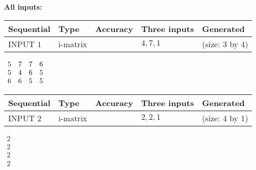 \documentclass[12pt]{article}
\begin{document}
   
\noindent\vspace{0.1in}\hspace{-0.08in} {\textbf{\Large{All inputs: }}}
   
   
  
  
\noindent\begin{tabular}{|l|l|l|l|l|}
\hline
 Sequential & Type & Accuracy & Three inputs & Generated \\ 
\hline
 
 
  INPUT $           1$ & i-matrix &  & $
 4
 , 
 7
 , 
 1
 $ & (size:           3 by           4)
 \\  \hline  
 \end{tabular}
   
   
 $\begin{array}{
 c
 c
 c
 c
 }
           5 & 
           7 & 
           7 & 
           6 \\ 
           5 & 
           4 & 
           6 & 
           5 \\ 
           6 & 
           6 & 
           5 & 
           5
\end{array}  $ 
  
  
\noindent\begin{tabular}{|l|l|l|l|l|}
\hline
 Sequential & Type & Accuracy & Three inputs & Generated \\ 
\hline
 
 
  INPUT $           2$ & i-matrix &  & $
 2
 , 
 2
 , 
 1
 $ & (size:           4 by           1)
 \\  \hline  
 \end{tabular}
   
   
 $\begin{array}{
 c
 }
           2 \\ 
           2 \\ 
           2 \\ 
           2
\end{array}  $ 
  
\end{document}
